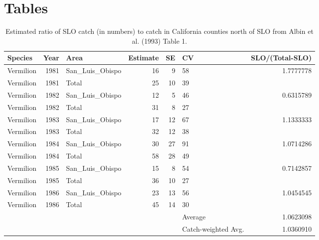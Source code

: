 \documentclass[
  english,
  a4paper,
]{article}
\begin{document}
\clearpage
{}

\hypertarget{tables}{%
\section{Tables}\label{tables}}

\begin{table}

\caption{\label{tab:albin-allocate}Estimated ratio of SLO catch (in numbers) to catch in California 
  counties north of SLO from Albin et al. (1993) Table 1.}
\centering
\fontsize{10}{12}\selectfont
\begin{tabular}[t]{lrlrrlr}
\toprule
Species & Year & Area & Estimate & SE & CV & SLO/(Total-SLO)\\
\midrule
Vermilion & 1981 & San\_Luis\_Obispo & 16 & 9 & 58 & 1.7777778\\
Vermilion & 1981 & Total & 25 & 10 & 39 & \\
Vermilion & 1982 & San\_Luis\_Obispo & 12 & 5 & 46 & 0.6315789\\
Vermilion & 1982 & Total & 31 & 8 & 27 & \\
Vermilion & 1983 & San\_Luis\_Obispo & 17 & 12 & 67 & 1.1333333\\
Vermilion & 1983 & Total & 32 & 12 & 38 & \\
Vermilion & 1984 & San\_Luis\_Obispo & 30 & 27 & 91 & 1.0714286\\
Vermilion & 1984 & Total & 58 & 28 & 49 & \\
Vermilion & 1985 & San\_Luis\_Obispo & 15 & 8 & 54 & 0.7142857\\
Vermilion & 1985 & Total & 36 & 10 & 27 & \\
Vermilion & 1986 & San\_Luis\_Obispo & 23 & 13 & 56 & 1.0454545\\
Vermilion & 1986 & Total & 45 & 14 & 30 & \\
 &  &  &  &  & Average & 1.0623098\\
 &  &  &  &  & Catch-weighted Avg. & 1.0360910\\
\bottomrule
\end{tabular}
\end{table}

\newpage

\begingroup\fontsize{10}{12}\selectfont
\end{document}
